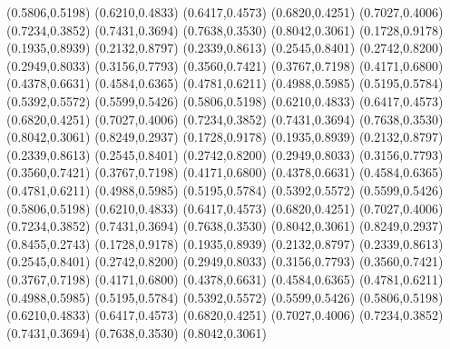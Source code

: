 \PST@Diamond(0.5806,0.5198)
\PST@Diamond(0.6210,0.4833)
\PST@Diamond(0.6417,0.4573)
\PST@Diamond(0.6820,0.4251)
\PST@Diamond(0.7027,0.4006)
\PST@Diamond(0.7234,0.3852)
\PST@Diamond(0.7431,0.3694)
\PST@Diamond(0.7638,0.3530)
\PST@Diamond(0.8042,0.3061)
\PST@Diamond(0.1728,0.9178)
\PST@Diamond(0.1935,0.8939)
\PST@Diamond(0.2132,0.8797)
\PST@Diamond(0.2339,0.8613)
\PST@Diamond(0.2545,0.8401)
\PST@Diamond(0.2742,0.8200)
\PST@Diamond(0.2949,0.8033)
\PST@Diamond(0.3156,0.7793)
\PST@Diamond(0.3560,0.7421)
\PST@Diamond(0.3767,0.7198)
\PST@Diamond(0.4171,0.6800)
\PST@Diamond(0.4378,0.6631)
\PST@Diamond(0.4584,0.6365)
\PST@Diamond(0.4781,0.6211)
\PST@Diamond(0.4988,0.5985)
\PST@Diamond(0.5195,0.5784)
\PST@Diamond(0.5392,0.5572)
\PST@Diamond(0.5599,0.5426)
\PST@Diamond(0.5806,0.5198)
\PST@Diamond(0.6210,0.4833)
\PST@Diamond(0.6417,0.4573)
\PST@Diamond(0.6820,0.4251)
\PST@Diamond(0.7027,0.4006)
\PST@Diamond(0.7234,0.3852)
\PST@Diamond(0.7431,0.3694)
\PST@Diamond(0.7638,0.3530)
\PST@Diamond(0.8042,0.3061)
\PST@Diamond(0.8249,0.2937)
\PST@Diamond(0.1728,0.9178)
\PST@Diamond(0.1935,0.8939)
\PST@Diamond(0.2132,0.8797)
\PST@Diamond(0.2339,0.8613)
\PST@Diamond(0.2545,0.8401)
\PST@Diamond(0.2742,0.8200)
\PST@Diamond(0.2949,0.8033)
\PST@Diamond(0.3156,0.7793)
\PST@Diamond(0.3560,0.7421)
\PST@Diamond(0.3767,0.7198)
\PST@Diamond(0.4171,0.6800)
\PST@Diamond(0.4378,0.6631)
\PST@Diamond(0.4584,0.6365)
\PST@Diamond(0.4781,0.6211)
\PST@Diamond(0.4988,0.5985)
\PST@Diamond(0.5195,0.5784)
\PST@Diamond(0.5392,0.5572)
\PST@Diamond(0.5599,0.5426)
\PST@Diamond(0.5806,0.5198)
\PST@Diamond(0.6210,0.4833)
\PST@Diamond(0.6417,0.4573)
\PST@Diamond(0.6820,0.4251)
\PST@Diamond(0.7027,0.4006)
\PST@Diamond(0.7234,0.3852)
\PST@Diamond(0.7431,0.3694)
\PST@Diamond(0.7638,0.3530)
\PST@Diamond(0.8042,0.3061)
\PST@Diamond(0.8249,0.2937)
\PST@Diamond(0.8455,0.2743)
\PST@Diamond(0.1728,0.9178)
\PST@Diamond(0.1935,0.8939)
\PST@Diamond(0.2132,0.8797)
\PST@Diamond(0.2339,0.8613)
\PST@Diamond(0.2545,0.8401)
\PST@Diamond(0.2742,0.8200)
\PST@Diamond(0.2949,0.8033)
\PST@Diamond(0.3156,0.7793)
\PST@Diamond(0.3560,0.7421)
\PST@Diamond(0.3767,0.7198)
\PST@Diamond(0.4171,0.6800)
\PST@Diamond(0.4378,0.6631)
\PST@Diamond(0.4584,0.6365)
\PST@Diamond(0.4781,0.6211)
\PST@Diamond(0.4988,0.5985)
\PST@Diamond(0.5195,0.5784)
\PST@Diamond(0.5392,0.5572)
\PST@Diamond(0.5599,0.5426)
\PST@Diamond(0.5806,0.5198)
\PST@Diamond(0.6210,0.4833)
\PST@Diamond(0.6417,0.4573)
\PST@Diamond(0.6820,0.4251)
\PST@Diamond(0.7027,0.4006)
\PST@Diamond(0.7234,0.3852)
\PST@Diamond(0.7431,0.3694)
\PST@Diamond(0.7638,0.3530)
\PST@Diamond(0.8042,0.3061)
